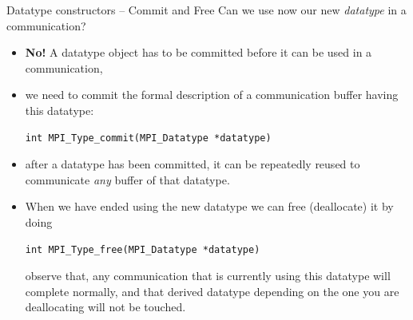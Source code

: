 \documentclass[xcolor={svgnames,usenames}]{beamer}
\begin{document}
\begin{frame}[fragile]{Datatype constructors -- Commit and Free}
	Can we use now our new \emph{datatype} in a communication?
	\begin{itemize}
		\item<2-> \textbf{No!} A datatype object has to be committed before it can be used in a communication,
		\item<3-> we need to commit the formal description of a communication buffer having this datatype:
\begin{verbatim}
int MPI_Type_commit(MPI_Datatype *datatype)
\end{verbatim}
		\item<4-> after a datatype has been committed, it can be repeatedly reused to communicate \emph{any} buffer of that datatype.
		\item<5-> When we have ended using the new datatype we can free (deallocate) it by doing
\begin{verbatim}
int MPI_Type_free(MPI_Datatype *datatype)
\end{verbatim}
observe that, any communication that is currently using this datatype will
complete normally, and that derived datatype depending on the one you are deallocating will not be touched.
	\end{itemize}
\end{frame}
\end{document}
